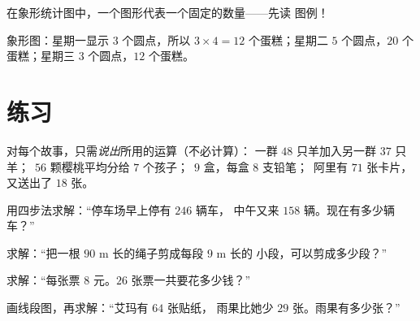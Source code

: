\begin{example}[象形统计图]\label{ex:g3:problems:pictogram}
在象形统计图中，一个图形代表一个固定的数量——先读
图例！

\begin{omfigure}

{\small 象形图：星期一显示 $3$ 个圆点，所以 $3 \times 4 = 12$
个蛋糕；星期二 $5$ 个圆点，$20$ 个蛋糕；星期三 $3$ 个圆点，$12$
个蛋糕。}
\end{omfigure}
\end{example}

\section{练习}

\begin{exercise}[$\star$]\label{exo:g3:problems:1}
对每个故事，只需\emph{说出}所用的运算（不必计算）：
一群 $48$ 只羊加入另一群 $37$ 只羊；\ $56$ 颗樱桃平均分给
$7$ 个孩子；\ $9$ 盒，每盒 $8$ 支铅笔；\ 阿里有 $71$ 张卡片，
又送出了 $18$ 张。
\end{exercise}

\begin{exercise}[$\star$]\label{exo:g3:problems:2}
用四步法求解：“停车场早上停有 $246$ 辆车，
中午又来 $158$ 辆。现在有多少辆车？”
\end{exercise}

\begin{exercise}[$\star$]\label{exo:g3:problems:3}
求解：“把一根 $90$ m 长的绳子剪成每段 $9$ m 长的
小段，可以剪成多少段？”
\end{exercise}

\begin{exercise}[$\star$]\label{exo:g3:problems:4}
求解：“每张票 $8$ 元。$26$ 张票一共要花多少钱？”
\end{exercise}

\begin{exercise}[$\star$]\label{exo:g3:problems:5}
画线段图，再求解：“艾玛有 $64$ 张贴纸，
雨果比她少 $29$ 张。雨果有多少张？”
\end{exercise}

